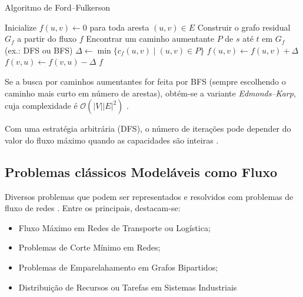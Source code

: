 \documentclass[12pt]{article}
\begin{document}
\begin{algorithm}[H]
\caption{Algoritmo de Ford–Fulkerson}
\label{alg:ford_fulkerson}
\begin{algorithmic}[1]
    \State Inicialize $f(u,v) \gets 0$ para toda aresta $(u,v) \in E$
        \State Construir o grafo residual $G_f$ a partir do fluxo $f$
        \State Encontrar um caminho aumentante $P$ de $s$ até $t$ em $G_f$ (ex.: DFS ou BFS)
        \State $\Delta \gets \min\{c_f(u,v) \mid (u,v) \in P\}$ 
            \State $f(u,v) \gets f(u,v) + \Delta$ 
            \State $f(v,u) \gets f(v,u) - \Delta$ 
        \EndFor
    \EndWhile
    \State \Return $f$ 
\EndProcedure
\end{algorithmic}
\end{algorithm}


\noindent Se a busca por caminhos aumentantes for feita por BFS (sempre escolhendo o caminho mais curto em número de arestas), obtém-se a variante \emph{Edmonds–Karp}, cuja complexidade é $\mathcal{O}(|V||E|^2)$ \cite{edmonds1972,ahuja1993}. 

Com uma estratégia arbitrária (DFS), o número de iterações pode depender do valor do fluxo máximo quando as capacidades são inteiras \cite{ford1956,tarjan1983}.






\subsection{Problemas clássicos Modeláveis como Fluxo} 

Diversos problemas que podem ser representados e resolvidos com problemas de fluxo de redes \cite{ahuja1993, cormen2009}. Entre os principais, destacam-se: 

\begin{itemize} 
\item Fluxo Máximo em Redes de Transporte ou Logística;
\item Problemas de Corte Mínimo em Redes; 
\item Problemas de Emparelahamento em Grafos Bipartidos;  
\item Distribuição de Recursos ou Tarefas em Sistemas Industriais 
\end{itemize}
\end{document}
